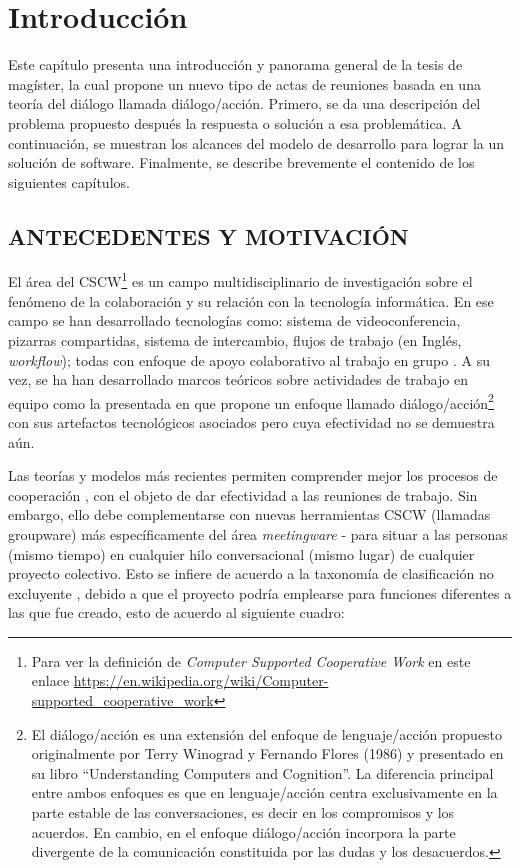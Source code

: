 \chapter{Introducción}\label{cap.introduccion}

Este capítulo presenta una introducción y panorama general de la tesis de magíster, la cual propone un nuevo tipo de actas de reuniones basada en una teoría del diálogo llamada diálogo/acción. Primero, se da una descripción del problema propuesto después la respuesta o solución a esa problemática. A continuación, se muestran los alcances del modelo de desarrollo para lograr la un solución de software. Finalmente, se describe brevemente el contenido de los siguientes capítulos.


\section{ANTECEDENTES Y MOTIVACIÓN}

El área del CSCW\footnote{Para ver la definición de \textit{Computer Supported Cooperative Work} en este enlace \url{https://en.wikipedia.org/wiki/Computer-supported_cooperative_work}} es un campo multidisciplinario de investigación sobre el fenómeno de la colaboración y su relación con la tecnología informática. En ese campo se han desarrollado tecnologías como: sistema de videoconferencia, pizarras compartidas, sistema de intercambio, flujos de trabajo (en Inglés, \textit{workflow}); todas con enfoque de apoyo colaborativo al trabajo en grupo \cite{RN32}. A su vez, se ha han desarrollado marcos teóricos sobre actividades de trabajo en equipo como la presentada en \cite{RN24} que propone un enfoque llamado diálogo/acción\footnote{El diálogo/acción es una extensión del enfoque de lenguaje/acción propuesto originalmente por Terry Winograd y Fernando Flores (1986) y presentado en su libro “Understanding Computers and Cognition”. La diferencia principal entre ambos enfoques es que en lenguaje/acción centra exclusivamente en la parte estable de las conversaciones, es decir en los compromisos y los acuerdos. En cambio, en el enfoque diálogo/acción incorpora la parte divergente de la comunicación constituida por las dudas y los desacuerdos.} con sus artefactos tecnológicos asociados pero cuya efectividad no se demuestra aún.

Las teorías y modelos más recientes permiten comprender mejor los procesos de cooperación \cite{RN27}, con el objeto de dar efectividad a las reuniones de trabajo. Sin embargo, ello debe complementarse con nuevas herramientas CSCW (llamadas groupware) más específicamente del área  \textit{meetingware} - para situar a las personas (mismo tiempo) en cualquier hilo conversacional (mismo lugar) de cualquier proyecto colectivo. Esto se infiere de acuerdo a la taxonomía de clasificación no excluyente \cite{RN2}, debido a que el proyecto podría emplearse para funciones diferentes a las que fue creado, esto de acuerdo al siguiente cuadro:

